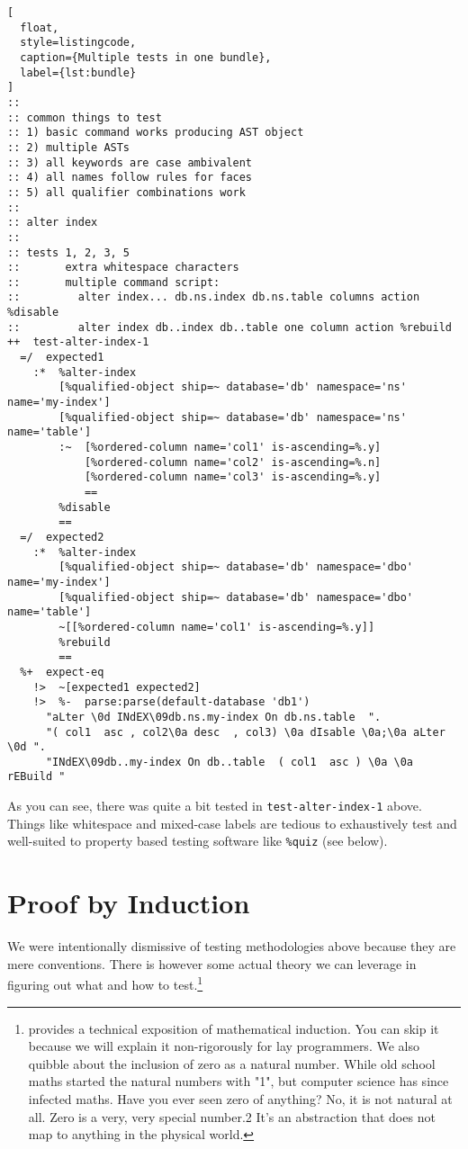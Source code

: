 \documentclass[twoside]{article}
\begin{document}
\begin{lstlisting}[
  float,
  style=listingcode,
  caption={Multiple tests in one bundle},
  label={lst:bundle}
]
::
:: common things to test
:: 1) basic command works producing AST object
:: 2) multiple ASTs
:: 3) all keywords are case ambivalent
:: 4) all names follow rules for faces
:: 5) all qualifier combinations work
::
:: alter index
::
:: tests 1, 2, 3, 5
::       extra whitespace characters
::       multiple command script:
::         alter index... db.ns.index db.ns.table columns action %disable
::         alter index db..index db..table one column action %rebuild
++  test-alter-index-1
  =/  expected1
    :*  %alter-index
        [%qualified-object ship=~ database='db' namespace='ns' name='my-index'] 
        [%qualified-object ship=~ database='db' namespace='ns' name='table']
        :~  [%ordered-column name='col1' is-ascending=%.y]
            [%ordered-column name='col2' is-ascending=%.n]
            [%ordered-column name='col3' is-ascending=%.y]
            ==
        %disable
        ==
  =/  expected2
    :*  %alter-index
        [%qualified-object ship=~ database='db' namespace='dbo' name='my-index']
        [%qualified-object ship=~ database='db' namespace='dbo' name='table']
        ~[[%ordered-column name='col1' is-ascending=%.y]]
        %rebuild
        ==
  %+  expect-eq
    !>  ~[expected1 expected2]
    !>  %-  parse:parse(default-database 'db1')
      "aLter \0d INdEX\09db.ns.my-index On db.ns.table  ".
      "( col1  asc , col2\0a desc  , col3) \0a dIsable \0a;\0a aLter \0d ".
      "INdEX\09db..my-index On db..table  ( col1  asc ) \0a \0a rEBuild "
\end{lstlisting}

\noindent
As you can see, there was quite a bit tested in \texttt{test-alter-index-1} above. Things like whitespace and mixed-case labels are tedious to exhaustively test and well-suited to property based testing software like \texttt{\%quiz} (see below).


\section{Proof by Induction}

We were intentionally dismissive of testing methodologies above because they are mere conventions. There is however some actual theory we can leverage in figuring out what and how to test.\footnote{\citet{TODO} provides a technical exposition of mathematical induction. You can skip it because we will explain it non-rigorously for lay programmers. We also quibble about the inclusion of zero as a natural number. While old school maths started the natural numbers with "1", but computer science has since infected maths. Have you ever seen zero of anything? No, it is not natural at all. Zero is a very, very special number.2 It's an abstraction that does not map to anything in the physical world.}
\end{document}
